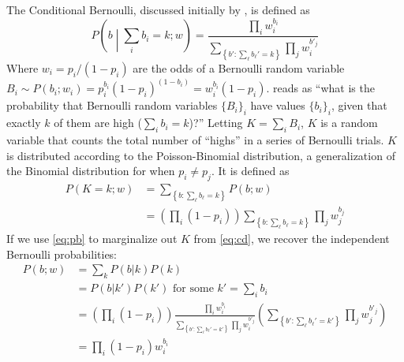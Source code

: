 \documentclass{article}
\begin{document}
The Conditional Bernoulli, discussed initially by
\citet{chenWeightedFinitePopulation1994}, is defined as
%
\begin{equation} \label{eq:cd}
    P\left(b\middle|\sum_i b_i = k; w\right) = \frac{\prod_i w_i^{b_i}}
        {\sum_{\left\{b' : \sum_\ell b_\ell' = k\right\}} \prod_j w_i^{b'_j}}
\end{equation}
%
Where $w_i = p_i/(1 - p_i)$ are the odds of a Bernoulli random variable $B_i
\sim P(b_i;w_i) = p_i^{b_i} (1 - p_i)^{(1 - b_i)} = w_i^{b_i} (1 - p_i)$.
 reads as ``what is the probability that Bernoulli random variables
$\{B_i\}_i$ have values $\{b_i\}_i$, given that exactly $k$ of them are high
($\sum_i b_i = k$)?'' Letting $K = \sum_i B_i$, $K$ is a random variable that
counts the total number of ``highs'' in a series of Bernoulli trials. $K$ is
distributed according to the Poisson-Binomial distribution, a generalization of
the Binomial distribution for when $p_i \neq p_j$. It is defined as
%
\begin{equation} \label{eq:pb}
    \begin{split}
    P(K = k;w) & = \sum_{\left\{b : \sum_\ell b_\ell = k\right\}} P(b;w) \\
               & = \left(\prod_i (1 - p_i)\right)
               \sum_{\left\{b : \sum_\ell b_\ell = k\right\}} \prod_j w_j^{b_j}
    \end{split}
\end{equation}
%
If we use \cref{eq:pb} to marginalize out $K$ from \cref{eq:cd}, we recover the
independent Bernoulli probabilities:
%
\begin{equation}
    \begin{split}
    P(b; w) &= \sum_k P(b|k) P(k) \\
            &= P(b|k') P(k') \text{ for some } k' = \sum_i b_i\\
            &= \left(\prod_i (1 - p_i)\right)\frac{\prod_i w_i^{b_i}}
                {\sum_{\left\{b' : \sum_\ell b_\ell' = k'\right\}}
                    \prod_j w_i^{b'_j}}
                \left(\sum_{\left\{b' : \sum_\ell b_\ell' = k'\right\}}
                    \prod_j w_j^{b'_j}\right) \\
            &= \prod_i (1 - p_i) w_i^{b_i}
    \end{split}
\end{equation}
%




\end{document}
